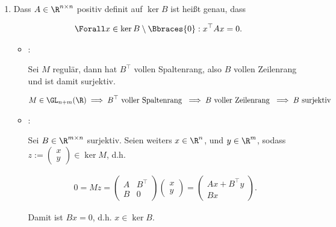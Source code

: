 \begin{solution}
\begin{enumerate}[label = \textbf{\alph*)}]
\begin{comment}
  \end{comment}

  \item Dass $A \in \R^{n \times n}$ positiv definit auf $\ker B$ ist heißt genau, dass
  
  \begin{align*}
    \Forall x \in \ker B \setminus \Bbraces{0}:
      x^\top A x = 0.
  \end{align*}

  \begin{itemize}

    \item \Quote{$\implies$}:
    
    Sei $M$ regulär, dann hat $B^\top$ vollen Spaltenrang, also $B$ vollen Zeilenrang und ist damit surjektiv.

    \begin{align*}
      M \in \GL_{n+m}(\R)
      \implies
      B^\top ~\text{voller Spaltenrang}~
      \implies
      B ~\text{voller Zeilenrang}~
      \implies
      B ~\text{surjektiv}
    \end{align*}

    \item \Quote{$\impliedby$}:

    Sei $B \in \R^{m \times n}$ surjektiv.
    Seien weiters $x \in \R^n$, und $y \in \R^m$, sodass $z := \begin{pmatrix} x \\ y \end{pmatrix} \in \ker M$, d.h.

    \begin{align*}
      0
      =
      M z
      =
      \begin{pmatrix}
        A & B^\top \\
        B & 0
      \end{pmatrix}
      \begin{pmatrix}
        x \\ y
      \end{pmatrix}
      =
      \begin{pmatrix}
        A x + B^\top y \\
        B x
      \end{pmatrix}.
    \end{align*}

    Damit ist $B x = 0$, d.h. $x \in \ker B$.


\end{itemize}
\end{enumerate}
\end{solution}
